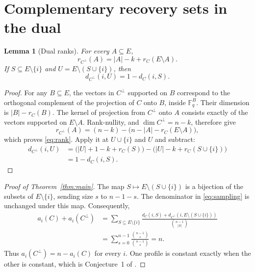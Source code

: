 \documentclass[11pt]{article}
\newtheorem{lemma}[theorem]{Lemma}
\theoremstyle{remark}
\newcommand{\F}{\mathbb F}
\begin{document}
\section{Complementary recovery sets in the dual}
\begin{lemma}[Dual ranks]\label{lem:rank}
For every $A\subseteq E$,
\begin{equation}\label{eq:rank}
 r_{C^\perp}(A)=|A|-k+r_C(E\setminus A).
\end{equation}
If $S\subseteq E\setminus\{i\}$ and
$U=E\setminus(S\cup\{i\})$, then
\begin{equation}\label{eq:increment}
                   d_{C^\perp}(i,U)=1-d_C(i,S).
\end{equation}
\end{lemma}
\begin{proof}
For any $B\subseteq E$, the vectors in $C^\perp$ supported on $B$ correspond
to the orthogonal complement of the projection of $C$ onto $B$, inside
$\F_q^B$. Their dimension is $|B|-r_C(B)$.
The kernel of projection from $C^\perp$ onto $A$ consists exactly of the
vectors supported on $E\setminus A$. Rank-nullity, and
$\dim C^\perp=n-k$, therefore give
\[
 r_{C^\perp}(A)=(n-k)
                 -\bigl(n-|A|-r_C(E\setminus A)\bigr),
\]
which proves \eqref{eq:rank}. Apply it at $U\cup\{i\}$ and $U$ and subtract:
\begin{align*}
 d_{C^\perp}(i,U)
 &=\bigl(|U|+1-k+r_C(S)\bigr)
       -\bigl(|U|-k+r_C(S\cup\{i\})\bigr)\\
 &=1-d_C(i,S).
\end{align*}
\end{proof}

\begin{proof}[Proof of Theorem~\ref{thm:main}]
The map $S\mapsto E\setminus(S\cup\{i\})$ is a bijection of the subsets
of $E\setminus\{i\}$, sending size $s$ to $n-1-s$. The denominator in
\eqref{eq:sampling} is unchanged under this map. Consequently,
\begin{align*}
 a_i(C)+a_i(C^\perp)
 &=\sum_{S\subseteq E\setminus\{i\}}
       \frac{d_C(i,S)+d_{C^\perp}(i,E\setminus(S\cup\{i\}))}
            {\binom{n-1}{|S|}}\\
 &=\sum_{s=0}^{n-1}\frac{\binom{n-1}s}{\binom{n-1}s}=n.
\end{align*}
Thus $a_i(C^\perp)=n-a_i(C)$ for every $i$. One profile is constant exactly
when the other is constant, which is Conjecture~1 of \cite{GBRY}.
\end{proof}
\end{document}
